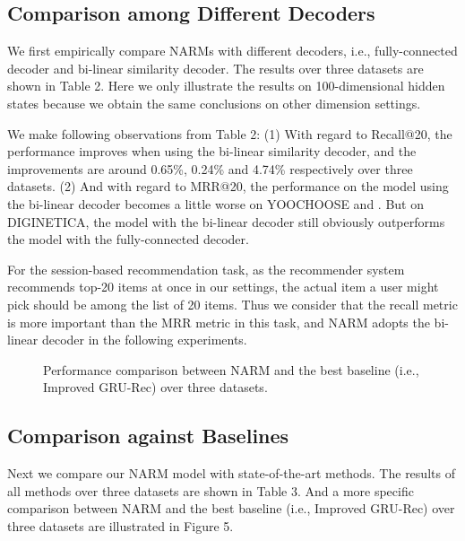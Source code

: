 \documentclass[sigconf]{acmart}
\begin{document}
\subsection{Comparison among Different Decoders}
We first empirically compare NARMs with different decoders, i.e., fully-connected decoder and bi-linear similarity decoder. The results over three datasets are shown in Table 2. Here we only illustrate the results on 100-dimensional hidden states because we obtain the same conclusions on other dimension settings.
  
We make following observations from Table 2: (1) With regard to Recall@20, the performance improves when using the bi-linear similarity decoder, and the improvements are around 0.65\%, 0.24\% and 4.74\% respectively over three datasets. (2) And with regard to MRR@20, the performance on the model using the bi-linear decoder becomes a little worse on YOOCHOOSE  and . But on DIGINETICA, the model with the bi-linear decoder still obviously outperforms the model with the fully-connected decoder.
  
For the session-based recommendation task, as the recommender system recommends top-20 items at once in our settings, the actual item a user might pick should be among the list of 20 items. Thus we consider that the recall metric is more important than the MRR metric in this task, and NARM adopts the bi-linear decoder in the following experiments.

    \begin{figure*}[htbp]
	    \centering
	    \vspace{0em} 
	    \vspace{0em} 
	    \caption{Performance comparison between NARM and the best baseline (i.e., Improved GRU-Rec) over three datasets.}
    \end{figure*}

\subsection{Comparison against Baselines}
Next we compare our NARM model with state-of-the-art methods. The results of all methods over three datasets are shown in Table 3. And a more specific comparison between NARM and the best baseline (i.e., Improved GRU-Rec) over three datasets are illustrated in Figure 5.
\end{document}
